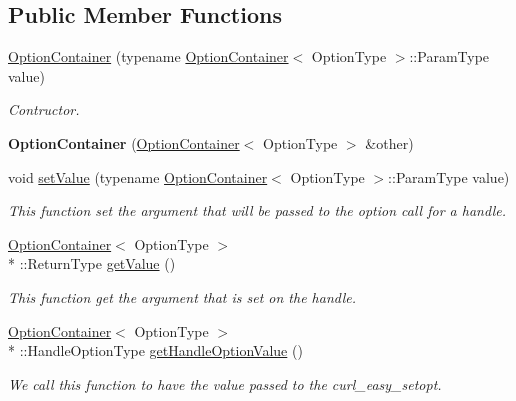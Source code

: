 \subsection*{Public Member Functions}
\begin{DoxyCompactItemize}
\item 
\hyperlink{classcurlpp_1_1internal_1_1OptionContainer_ab4ae19d723a83601263feb52ad3584cc}{Option\-Container} (typename \hyperlink{classcurlpp_1_1internal_1_1OptionContainer}{Option\-Container}$<$ Option\-Type $>$\-::Param\-Type value)
\begin{DoxyCompactList}\small\item\em Contructor. \end{DoxyCompactList}\item 
\hypertarget{classcurlpp_1_1internal_1_1OptionContainer_aadfba725b98ad3c2aa5fb8672879d46f}{{\bfseries Option\-Container} (\hyperlink{classcurlpp_1_1internal_1_1OptionContainer}{Option\-Container}$<$ Option\-Type $>$ \&other)}\label{classcurlpp_1_1internal_1_1OptionContainer_aadfba725b98ad3c2aa5fb8672879d46f}

\item 
void \hyperlink{classcurlpp_1_1internal_1_1OptionContainer_a2922047662c00e56a17e846093726b5b}{set\-Value} (typename \hyperlink{classcurlpp_1_1internal_1_1OptionContainer}{Option\-Container}$<$ Option\-Type $>$\-::Param\-Type value)
\begin{DoxyCompactList}\small\item\em This function set the argument that will be passed to the option call for a handle. \end{DoxyCompactList}\item 
\hypertarget{classcurlpp_1_1internal_1_1OptionContainer_a30fe5c33aef33f58cb6b6875c00fb8a0}{\hyperlink{classcurlpp_1_1internal_1_1OptionContainer}{Option\-Container}$<$ Option\-Type $>$\\*
\-::Return\-Type \hyperlink{classcurlpp_1_1internal_1_1OptionContainer_a30fe5c33aef33f58cb6b6875c00fb8a0}{get\-Value} ()}\label{classcurlpp_1_1internal_1_1OptionContainer_a30fe5c33aef33f58cb6b6875c00fb8a0}

\begin{DoxyCompactList}\small\item\em This function get the argument that is set on the handle. \end{DoxyCompactList}\item 
\hyperlink{classcurlpp_1_1internal_1_1OptionContainer}{Option\-Container}$<$ Option\-Type $>$\\*
\-::Handle\-Option\-Type \hyperlink{classcurlpp_1_1internal_1_1OptionContainer_a9930edf1e2a8e33a94688f52bb897bb2}{get\-Handle\-Option\-Value} ()
\begin{DoxyCompactList}\small\item\em We call this function to have the value passed to the curl\-\_\-easy\-\_\-setopt. \end{DoxyCompactList}\end{DoxyCompactItemize}


